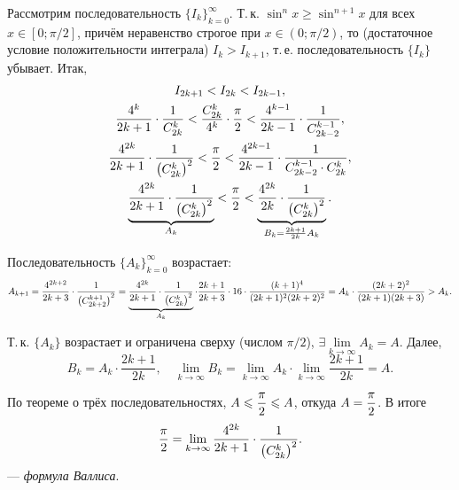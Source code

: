Рассмотрим последовательность $\{I_k\}_{k = 0}^\infty$. Т.\,к. $\sin^n x \geqslant \sin^{n + 1}x$ для всех $x \in [0; \pi / 2]$, причём неравенство строгое при $x \in (0; \pi / 2)$, то (достаточное условие положительности интеграла) $I_k > I_{k + 1}$, т.\,е. последовательность $\{I_k\}$ убывает. Итак,
\begin{gather*}
    I_{2k + 1} < I_{2k} < I_{2k - 1},\\
    \frac{4^k}{2k + 1} \cdot \frac{1}{C_{2k}^k} < \frac{C_{2k}^k}{4^k} \cdot \frac{\pi}{2} < \frac{4^{k - 1}}{2k - 1}\cdot\frac{1}{C_{2k - 2}^{k - 1}},\\
    \frac{4^{2k}}{2k + 1}\cdot\frac{1}{\left(C_{2k}^k\right)^2} < \frac{\pi}{2} < \frac{4^{2k - 1}}{2k - 1} \cdot \frac{1}{C_{2k - 2}^{k - 1} \cdot C_{2k}^k},\\
    \underbrace{\frac{4^{2k}}{2k + 1} \cdot \frac{1}{\left(C_{2k}^k\right)^2}}_{A_k} < \frac{\pi}{2} < \underbrace{\frac{4^{2k}}{2k} \cdot \frac{1}{\left(C_{2k}^k\right)^2}}_{B_k = \frac{2k + 1}{2k}A_k}.
\end{gather*}

Последовательность $\{A_k\}_{k = 0}^\infty$ возрастает:
\[
    A_{k + 1} = \frac{4^{2k + 2}}{2k + 3} \cdot \frac{1}{\left(C_{2k + 2}^{k + 1}\right)^2} = \underbrace{\frac{4^{2k}}{2k + 1} \cdot \frac{1}{\left(C_{2k}^k\right)^2}}_{A_k} \cdot \frac{2k + 1}{2k + 3} \cdot 16 \cdot \frac{(k + 1)^4}{(2k + 1)^2(2k + 2)^2} = A_k \cdot \frac{(2k + 2)^2}{(2k + 1)(2k + 3)} > A_k.
\]

Т.\,к. $\{A_k\}$ возрастает и ограничена сверху (числом $\pi / 2$), $\exists\lim\limits_{k \to \infty}A_k = A$. Далее,
\[
    B_k = A_k \cdot \frac{2k + 1}{2k},\quad \lim_{k \to \infty}B_k = \lim_{k \to \infty}A_k \cdot \lim_{k \to \infty}\frac{2k + 1}{2k} = A.
\]

По теореме о трёх последовательностях, $\displaystyle A \leqslant \frac{\pi}{2} \leqslant A$, откуда $\displaystyle A = \frac{\pi}{2}$. В итоге
\[
    \frac{\pi}{2} = \lim_{k \to \infty}\frac{4^{2k}}{2k + 1} \cdot \frac{1}{\left(C_{2k}^k\right)^2}.
\]
--- \textit{формула Валлиса}.

